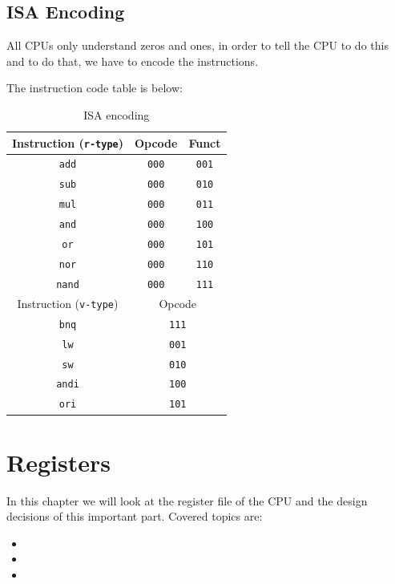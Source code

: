 \documentclass[12pt, dvipsnames, svgnames, x11names, oneside]{book}
\newenvironment{sansserif}{\sffamily}{\normalfont}
\begin{document}
		\section{ISA Encoding}\label{sec:isa-encode}
		All CPUs only understand zeros and ones, in order to tell the CPU to do this and to do that, we have to encode the instructions.
		
		The instruction code table is below:
		
		\begin{table}[h]\label{sec:table:isd-encode}
			\caption{ISA encoding}
			\begin{center}
				\begin{tabular}{|c|c|c|}
					\hline
					Instruction (\texttt{r-type}) & Opcode & Funct \\
					\hline
					\texttt{add} & \texttt{000} & \texttt{001} \\
					\hline
					\texttt{sub} & \texttt{000} & \texttt{010} \\
					\hline
					\texttt{mul} & \texttt{000} & \texttt{011} \\
					\hline
					\texttt{and} & \texttt{000} & \texttt{100} \\
					\hline
					\texttt{or} & \texttt{000} & \texttt{101} \\
					\hline
					\texttt{nor} & \texttt{000} & \texttt{110} \\
					\hline
					\texttt{nand} & \texttt{000} & \texttt{111} \\
					\hline		
					\hline
					Instruction (\texttt{v-type}) & \multicolumn{2}{|c|}{Opcode} \\
					\hline
					\texttt{bnq} & \multicolumn{2}{|c|}{\texttt{111}} \\
					\hline
					\texttt{lw}  & \multicolumn{2}{|c|}{\texttt{001}} \\
					\hline
					\texttt{sw} & \multicolumn{2}{|c|}{\texttt{010}} \\
					\hline
					\texttt{andi} & \multicolumn{2}{|c|}{\texttt{100}} \\
					\hline
					\texttt{ori} & \multicolumn{2}{|c|}{\texttt{101}} \\
					\hline
				\end{tabular}
			\end{center}
		\end{table}
		
		\chapter{Registers}
		\begin{sansserif}
			In this chapter we will look at the register file of the CPU and the design decisions of this important part. Covered topics are:
			\begin{itemize}
				\item {}
				\item {}
				\item {}
			\end{itemize}
		\end{sansserif} 
		
\end{document}
